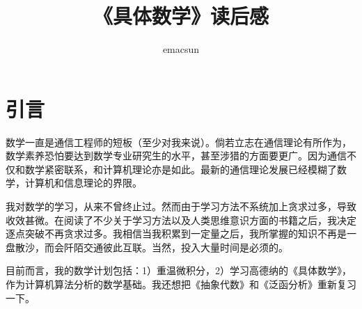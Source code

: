 \documentclass[10pt,a4paper,UTF8]{article}
\author{emacsun}
\date{}
\title{《具体数学》读后感}
\begin{document}
\maketitle\xiaosihao
\tableofcontents\newpage\newpage


\section{引言}
\label{sec:orgheadline1}


数学一直是通信工程师的短板（至少对我来说）。倘若立志在通信理论有所作为，数学素养恐怕要达到数学专业研究生的水平，甚至涉猎的方面要更广。因为通信不仅和数学紧密联系，和计算机理论亦是如此。最新的通信理论发展已经模糊了数学，计算机和信息理论的界限。

我对数学的学习，从来不曾终止过。然而由于学习方法不系统加上贪求过多，导致收效甚微。在阅读了不少关于学习方法以及人类思维意识方面的书籍之后，我决定逐点突破不再贪求过多。我相信当我积累到一定量之后，我所掌握的知识不再是一盘散沙，而会阡陌交通彼此互联。当然，投入大量时间是必须的。

目前而言，我的数学计划包括：1）重温微积分，2）学习高德纳的《具体数学》，作为计算机算法分析的数学基础。我还想把《抽象代数》和《泛函分析》重新复习一下。
\end{document}
